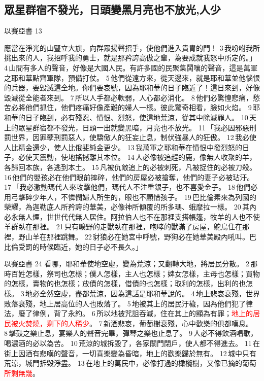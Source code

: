 \subsection{眾星群宿不發光，日頭變黑月亮也不放光,人少}
以賽亞書 13

應當在淨光的山豎立大旗，向群眾揚聲招手，使他們進入貴胄的門！ 3 我吩咐我所挑出來的人，我招呼我的勇士，就是那矜誇高傲之輩，為要成就我怒中所定的。」 4 山間有多人的聲音，好像是大國人民。有許多國的民聚集鬨嚷的聲音，這是萬軍之耶和華點齊軍隊，預備打仗。 5 他們從遠方來，從天邊來，就是耶和華並他惱恨的兵器，要毀滅這全地。你們要哀號，因為耶和華的日子臨近了！這日來到，好像毀滅從全能者來到。 7 所以人手都必軟弱，人心都必消化。 8 他們必驚惶悲痛，愁苦必將他們抓住，他們疼痛好像產難的婦人一樣。彼此驚奇相看，臉如火焰。 9 耶和華的日子臨到，必有殘忍、憤恨、烈怒，使這地荒涼，從其中除滅罪人。 10 天上的眾星群宿都不發光，日頭一出就變黑暗，月亮也不放光。 11 「我必因邪惡刑罰世界，因罪孽刑罰惡人，使驕傲人的狂妄止息，制伏強暴人的狂傲。 12 我必使人比精金還少，使人比俄斐純金更少。 13 我萬軍之耶和華在憤恨中發烈怒的日子，必使天震動，使地搖撼離其本位。 14 人必像被追趕的鹿，像無人收聚的羊，各歸回本族，各逃到本土。 15 凡被仇敵追上的必被刺死，凡被捉住的必被刀殺。 16 他們的嬰孩必在他們眼前摔碎，他們的房屋必被搶奪，他們的妻子必被玷汙。17 「我必激動瑪代人來攻擊他們，瑪代人不注重銀子，也不喜愛金子。 18 他們必用弓擊碎少年人，不憐憫婦人所生的，眼也不顧惜孩子。 19 巴比倫素來為列國的榮耀，為迦勒底人所矜誇的華美，必像神所傾覆的所多瑪、蛾摩拉一樣。 20 其內必永無人煙，世世代代無人居住。阿拉伯人也不在那裡支搭帳篷，牧羊的人也不使羊群臥在那裡。 21 只有曠野的走獸臥在那裡，咆哮的獸滿了房屋，鴕鳥住在那裡，野山羊在那裡跳舞。 22 豺狼必在她宮中呼號，野狗必在她華美殿內吼叫。巴比倫受罰的時候臨近，她的日子必不長久。」

以賽亞書 24
看哪，耶和華使地空虛，變為荒涼；又翻轉大地，將居民分散。 2 那時百姓怎樣，祭司也怎樣；僕人怎樣，主人也怎樣；婢女怎樣，主母也怎樣；買物的怎樣，賣物的也怎樣；放債的怎樣，借債的也怎樣；取利的怎樣，出利的也怎樣。 3 地必全然空虛，盡都荒涼，因為這話是耶和華說的。 4 地上悲哀衰殘，世界敗落衰殘，地上居高位的人也敗落了。 5 地被其上的居民汙穢，因為他們犯了律法，廢了律例，背了永約。 6 所以地被咒詛吞滅，住在其上的顯為有罪；\textcolor{red}{地上的居民被火焚燒，剩下的人稀少}。 7 新酒悲哀，葡萄樹衰殘，心中歡樂的俱都嘆息。 8 擊鼓之樂止息，宴樂人的聲音完畢，彈琴之樂也止息了。 9 人必不得飲酒唱歌，喝濃酒的必以為苦。 10 荒涼的城拆毀了，各家關門閉戶，使人都不得進去。 11 在街上因酒有悲嘆的聲音，一切喜樂變為昏暗，地上的歡樂歸於無有。 12 城中只有荒涼，城門拆毀淨盡。 13 在地上的萬民中，必像打過的橄欖樹，又像已摘的葡萄\textcolor{red}{所剩無幾}。

